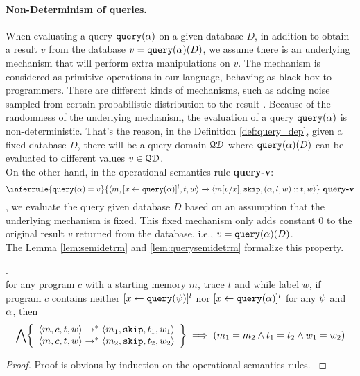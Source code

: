\documentclass[a4paper,11pt]{article}
\begin{document}
\paragraph{Non-Determinism of queries.}
% 
{
When evaluating a query ${\tt query}(\alpha)$ on a given database $D$, 
in addition to obtain a result $v$ from the database $v = {\tt query}(\alpha)(D)$,
we assume there is an underlying mechanism that will perform extra manipulations on $v$. 
The mechanism is considered as primitive operations in our language, behaving as black box to programmers.
There are different kinds of mechanisms, 
such as adding noise sampled from certain probabilistic distribution to the result \cite{dwork2015preserving}.
Because of the randomness of the underlying mechanism, the evaluation of a query ${\tt query}(\alpha)$ is non-deterministic. 
That's the reason, in the Definition \ref{def:query_dep}, given a fixed database $D$, there will be a query domain $\mathcal{QD}$ where ${\tt query}(\alpha)(D) $ can be evaluated to different values $v \in \mathcal{QD}$.
}
\\
{
On the other hand, in the operational semantics rule \textbf{query-v}:
\[
		\inferrule
	{
	\query(\qval) = v
	}
	{
	\config{m, [\assign{x}{\query(\qval)}]^l, t, w} 
	\xrightarrow{} 
	\config{m[ v/ x], \eskip,  (\qval, l, w) :: t,w }
	}
	~\textbf{query-v}
	\]
, we evaluate the query given database $D$ based on an assumption that the underlying mechanism is fixed.
This fixed mechanism only adds constant $0$ to the original result $v$ returned from the database, i.e., $v = {\tt query}(\alpha)(D)$. 
}
%
\\
%
The Lemma \ref{lem:semidetrm} and \ref{lem:querysemidetrm} formalize this property.
%
\begin{lem}
.
\label{lem:semidetrm}\\
{
for any program $c$ with a starting memory $m$, trace $t$ and while label $w$, 
if program $c$ contains neither  
$[\mathrel{ x \leftarrow {\tt query}(\psi) }]^l$ nor $[\mathrel{ x \leftarrow {\tt query}(\alpha) }]^l$ for any $\psi$ and $\alpha$, then
%
$$
\bigwedge
\left\{\begin{array}{l}
\config{m, c, t, w} 
\rightarrow^{*} 
\config{m_1, \eskip, t_1, w_1} 
\\ 
\config{m, c, t, w} 
\rightarrow^{*} 
\config{m_2, \eskip, t_2, w_2} 
\end{array}
\right\}
\implies
(m_1 = m_2 \land t_1 = t_2 \land w_1 = w_2)
 $$ 
}
\end{lem}
%
\begin{proof}
{
Proof is obvious by induction on the operational semantics rules.
}
\end{proof}
\end{document}
